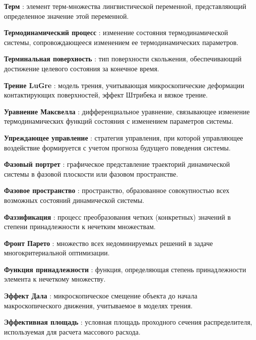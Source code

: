 \textbf{Терм} : элемент терм-множества лингвистической переменной, представляющий определенное значение этой переменной.

\textbf{Термодинамический процесс} : изменение состояния термодинамической системы, сопровождающееся изменением ее термодинамических параметров.

\textbf{Терминальная поверхность} : тип поверхности скольжения, обеспечивающий достижение целевого состояния за конечное время.

\textbf{Трение LuGre} : модель трения, учитывающая микроскопические деформации контактирующих поверхностей, эффект Штрибека и вязкое трение.

\textbf{Уравнение Максвелла} : дифференциальное уравнение, связывающее изменение термодинамических функций состояния с изменением параметров системы.

\textbf{Упреждающее управление} : стратегия управления, при которой управляющее воздействие формируется с учетом прогноза будущего поведения системы.

\textbf{Фазовый портрет} : графическое представление траекторий динамической системы в фазовой плоскости или фазовом пространстве.

\textbf{Фазовое пространство} : пространство, образованное совокупностью всех возможных состояний динамической системы.

\textbf{Фаззификация} : процесс преобразования четких (конкретных) значений в степени принадлежности к нечетким множествам.

\textbf{Фронт Парето} : множество всех недоминируемых решений в задаче многокритериальной оптимизации.

\textbf{Функция принадлежности} : функция, определяющая степень принадлежности элемента к нечеткому множеству.

\textbf{Эффект Дала} : микроскопическое смещение объекта до начала макроскопического движения, учитываемое в моделях трения.

\textbf{Эффективная площадь} : условная площадь проходного сечения распределителя, используемая для расчета массового расхода.

